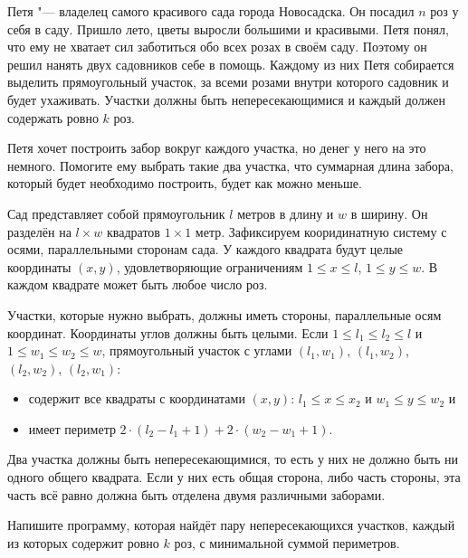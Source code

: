 Петя "--- владелец самого красивого сада города Новосадска. Он посадил $n$
роз у себя в саду. Пришло лето, цветы выросли большими и красивыми.
Петя понял, что ему не хватает сил заботиться обо всех розах в своём саду.
Поэтому он решил нанять двух садовников себе в помощь. Каждому из них Петя
собирается выделить прямоугольный участок, за всеми розами внутри которого
садовник и будет ухаживать. Участки должны быть непересекающимися и каждый
должен содержать ровно $k$ роз.

Петя хочет построить забор вокруг каждого участка, но денег у него на это
немного. Помогите ему выбрать такие два участка, что суммарная длина забора,
который будет необходимо построить, будет как можно меньше.

Сад представляет собой прямоугольник $l$ метров в длину и $w$ в ширину.
Он разделён на $l \times w$ квадратов $1 \times 1$ метр. Зафиксируем
кооридинатную систему с осями, параллельными сторонам сада. У каждого
квадрата будут целые координаты $(x, y)$, удовлетворяющие ограничениям
$1 \le x \le l$, $1 \le y \le w$. В каждом квадрате может быть любое
число роз.

Участки, которые нужно выбрать, должны иметь стороны, параллельные осям
координат. Координаты углов должны быть целыми. Если
$1 \le l_1 \le l_2 \le l$ и $1 \le w_1 \le w_2 \le w$, прямоугольный участок
с углами $(l_1, w_1)$, $(l_1, w_2)$, $(l_2, w_2)$, $(l_2, w_1)$:
\begin{itemize}
  \item содержит все квадраты с координатами $(x, y)$: $l_1 \le x \le x_2$ и
    $w_1 \le y \le w_2$ и
  \item имеет периметр $2 \cdot (l_2 - l_1 + 1) + 2 \cdot (w_2 - w_1 + 1)$.
\end{itemize}

Два участка должны быть непересекающимися, то есть у них не должно быть ни
одного общего квадрата. Если у них есть общая сторона, либо часть стороны,
эта часть всё равно должна быть отделена двумя различными заборами.

Напишите программу, которая найдёт пару непересекающихся участков, каждый
из которых содержит ровно $k$ роз, с минимальной суммой периметров.

